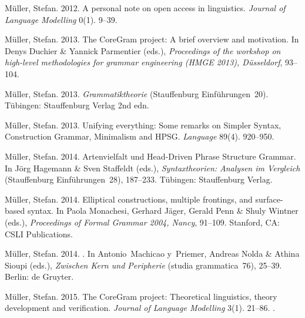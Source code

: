 \begin{thebibliography}{1420}
M{\"u}ller, Stefan. 2012{}.
\newblock A personal note on open access in linguistics.
\newblock \emph{Journal of Language Modelling} 0(1). 9--39.

M{\"u}ller, Stefan. 2013{}.
\newblock The {CoreGram} project: {A} brief overview and motivation.
\newblock In Denys Duchier \& Yannick Parmentier (eds.), \emph{Proceedings of
  the workshop on high-level methodologies for grammar engineering {(HMGE
  2013), D{\"u}sseldorf}}, 93--104.

M{\"u}ller, Stefan. 2013{}.
\newblock \emph{{Grammatiktheorie}} (Stauffenburg Einf{\"u}hrungen~20).
\newblock T{\"u}bingen: Stauffenburg Verlag 2nd edn.

M{\"u}ller, Stefan. 2013{}.
\newblock Unifying everything: {Some} remarks on {Simpler Syntax},
  {Construction Grammar}, {Minimalism} and {HPSG}.
\newblock \emph{Language} 89(4). 920--950.

M{\"u}ller, Stefan. 2014{}.
\newblock Artenvielfalt und {Head-Driven Phrase Structure Grammar}.
\newblock In J{\"o}rg Hagemann \& Sven Staffeldt (eds.), \emph{{Syntaxtheorien:
  Analysen im Vergleich}} (Stauffenburg Einf{\"u}hrungen~28), 187--233.
  T\"u\-bing\-en: Stauffenburg Verlag.

M{\"u}ller, Stefan. 2014{}.
\newblock Elliptical constructions, multiple frontings, and surface-based
  syntax.
\newblock In Paola Monachesi, Gerhard J{\"a}ger, Gerald Penn \& Shuly Wintner
  (eds.), \emph{Proceedings of {Formal Grammar} 2004, {Nancy}}, 91--109.
  Stanford, CA: CSLI Publications.

M{\"u}ller, Stefan. 2014{}.
.
\newblock In Antonio~Machicao y~Priemer, Andreas Nolda \& Athina Sioupi (eds.),
  \emph{{Zwischen Kern und Peripherie}} (studia grammatica~76), 25--39. Berlin:
  de Gruyter.

M{\"u}ller, Stefan. 2015{}.
\newblock The {CoreGram} project: {Theoretical} linguistics, theory development
  and verification.
\newblock \emph{Journal of Language Modelling} 3(1). 21--86.
\newblock {}.


\end{thebibliography}
